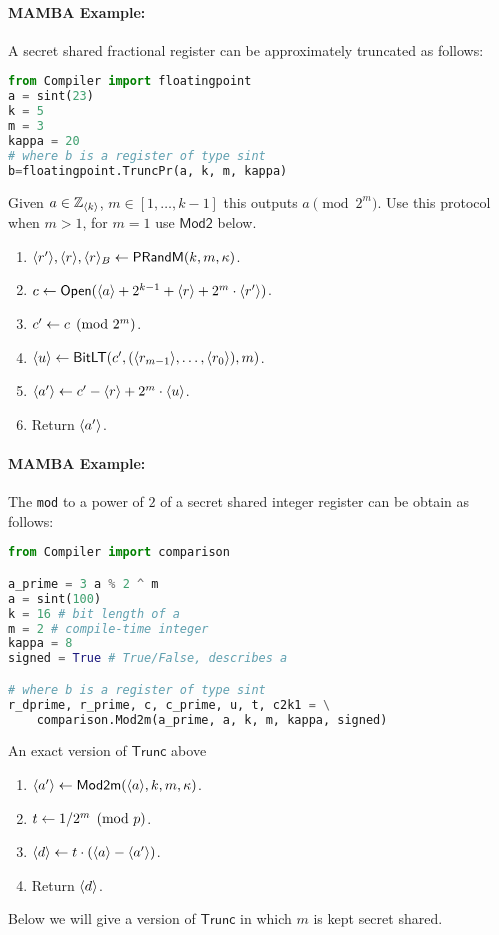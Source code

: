 \paragraph{MAMBA Example:} A secret shared fractional register can be approximately truncated as follows: 
\begin{lstlisting}[language={python}]
from Compiler import floatingpoint
a = sint(23)
k = 5
m = 3
kappa = 20
# where b is a register of type sint
b=floatingpoint.TruncPr(a, k, m, kappa)
\end{lstlisting}

Given $a \in {\mathbb{Z}}_{\langle k \rangle}$, $m \in [1,\ldots,k-1]$ this outputs $a \pmod{2^m}$.
Use this protocol when $m>1$, for $m=1$ use $\mathsf{Mod2}$ below.
\begin{enumerate}
\item $\langle r' \rangle, \langle r \rangle, \langle r \rangle_B \leftarrow \mathsf{PRandM}(k,m,\kappa)$.
\item $c \leftarrow {\mathsf{Open}}(\langle a \rangle+2^{k-1}+\langle r \rangle+2^m \cdot \langle r' \rangle)$.
\item $c'\leftarrow c \pmod{2^m}$.
\item $\langle u \rangle \leftarrow \mathsf{BitLT}(c',(\langle r_{m-1} \rangle,\ldots,\langle r_0 \rangle),m)$.
\item $\langle a' \rangle \leftarrow c'-\langle r \rangle+2^m \cdot \langle u \rangle$.
\item Return $\langle a' \rangle$.
\end{enumerate}

\paragraph{MAMBA Example:} The \verb|mod| to a power of $2$ of a secret shared integer register can be obtain as follows: 
\begin{lstlisting}[language={python}]
from Compiler import comparison

a_prime = 3 a % 2 ^ m
a = sint(100)
k = 16 # bit length of a
m = 2 # compile-time integer
kappa = 8 
signed = True # True/False, describes a

# where b is a register of type sint
r_dprime, r_prime, c, c_prime, u, t, c2k1 = \
    comparison.Mod2m(a_prime, a, k, m, kappa, signed)
\end{lstlisting}


An exact version of $\mathsf{Trunc}$ above
\begin{enumerate}
\item $\langle a' \rangle \leftarrow \mathsf{Mod2m}(\langle a \rangle,k,m, \kappa)$.
\item $t \leftarrow 1/2^m \pmod{p}$.
\item $\langle d \rangle \leftarrow t \cdot (\langle a \rangle-\langle a' \rangle)$.
\item Return $\langle d \rangle$.
\end{enumerate}
Below we will give a version of $\mathsf{Trunc}$ in which $m$ is kept secret shared.
